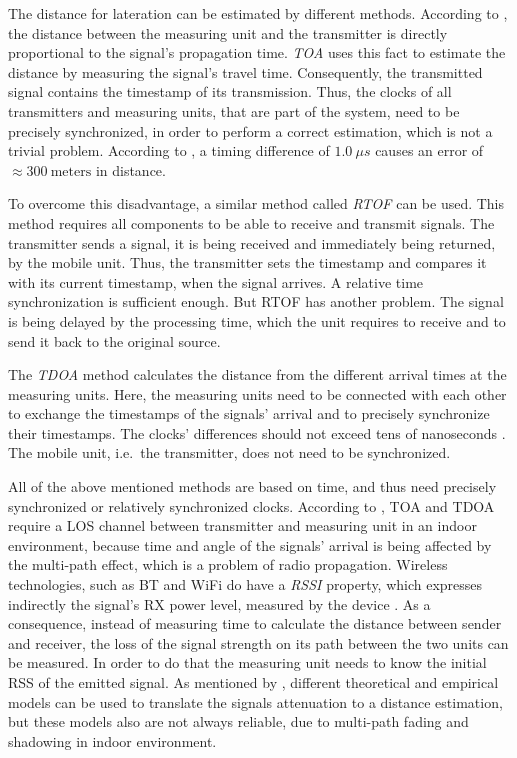 The distance for lateration can be estimated by different methods. According to \citet{IEEE:survey_wireless_indoor_pos}, the distance between the measuring unit and the transmitter is directly proportional to the signal's propagation time.
\emph{\ac{TOA}} uses this fact to estimate the distance by measuring the signal's travel time. Consequently, the transmitted signal contains the timestamp of its transmission. Thus, the clocks of all transmitters and measuring units, that are part of the system, need to be precisely synchronized, in order to perform a correct estimation, which is not a trivial problem. According to \citet{kotanen:exp_local_pos_bt}, a timing difference of  $1.0~\mu s$ causes an error of $\approx 300~\text{meters}$ in distance.

To overcome this disadvantage, a similar method called \emph{\ac{RTOF}} can be used. This method requires all components to be able to receive and transmit signals. The transmitter sends a signal, it is being received and immediately being returned, by the mobile unit. Thus, the transmitter sets the timestamp and compares it with its current timestamp, when the signal arrives. A relative time synchronization is sufficient enough. But \acs{RTOF} has another problem. The signal is being delayed by the processing time, which the unit requires to receive and to send it back to the original source.

The \emph{\ac{TDOA}} method calculates the distance from the different arrival times at the measuring units. Here, the measuring units need to be connected with each other to exchange the timestamps of the signals' arrival and to precisely synchronize their timestamps. The clocks' differences should not exceed tens of nanoseconds \citep{kotanen:exp_local_pos_bt}. The mobile unit, i.e.\ the transmitter, does not need to be synchronized. 

All of the above mentioned methods are based on time, and thus need precisely synchronized or relatively synchronized clocks. According to \citet{IEEE:survey_wireless_indoor_pos}, \acs{TOA} and \acs{TDOA} require a \acs{LOS} channel between transmitter and measuring unit in an indoor environment, because time and angle of the signals' arrival is being affected by the multi-path effect, which is a problem of radio propagation. Wireless technologies, such as \acl{BT} and WiFi do have a \emph{\ac{RSSI}} property, which expresses indirectly the signal's \ac{RX} power level, measured by the device \citep{kotanen:exp_local_pos_bt}. As a consequence, instead of measuring time to calculate the distance between sender and receiver, the loss of the signal strength on its path between the two units can be measured. In order to do that the measuring unit needs to know the initial \ac{RSS} of the emitted signal. As mentioned by \citet{IEEE:survey_wireless_indoor_pos}, different theoretical and empirical models can be used to translate the signals attenuation to a distance estimation, but these models also are not always reliable, due to multi-path fading and shadowing in indoor environment.


